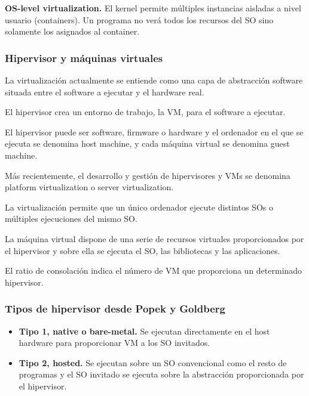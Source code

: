 \documentclass{article}
\begin{document}
			\textbf{OS-level virtualization.} El kernel permite  múltiples instancias aisladas a nivel usuario (containers). Un programa no verá todos los recursos del SO sino solamente los asignados al container.	
		
		\subsubsection{Hipervisor y máquinas virtuales}
			La virtualización actualmente se entiende como una capa de abstracción software situada entre el software a ejecutar y el hardware real.
			
			El hipervisor crea un entorno de trabajo, la VM, para el software a ejecutar. 
			
			El hipervisor puede ser software, firmware o hardware y el ordenador en el que se ejecuta se denomina host machine, y cada máquina virtual se denomina guest machine.
			
			Más recientemente, el desarrollo y gestión de hipervisores y VMs se denomina platform virtualization o server virtualization.
			
			La virtualización permite que un único ordenador ejecute distintos SOs o múltiples ejecuciones del mismo SO.
			
			La máquina virtual dispone de una serie de recursos virtuales proporcionados por el hipervisor y sobre ella se ejecuta el SO, las bibliotecas y las aplicaciones.
			
			El ratio de consolación indica el número de VM que proporciona un determinado hipervisor.
		
		\subsubsection{Tipos de hipervisor desde Popek y Goldberg}
			\begin{itemize}
			\item \textbf{Tipo 1, native o bare-metal.} Se ejecutan directamente en el host hardware para proporcionar VM a los SO invitados.
			\item \textbf{Tipo 2, hosted.} Se ejecutan sobre un SO convencional como el resto de programas y el SO invitado se ejecuta sobre la abstracción proporcionada por el hipervisor.
			\end{itemize}
			
\end{document}
